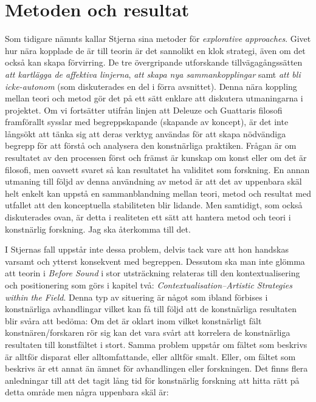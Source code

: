 \documentclass[11pt]{article}
\begin{document}
\section{Metoden och resultat}
\label{sec:orgda3e826}
Som tidigare nämnts kallar Stjerna sina metoder för \emph{explorative
approaches}. Givet hur nära kopplade de är till teorin är det sannolikt
en klok strategi, även om det också kan skapa förvirring. De tre
övergripande utforskande tillvägagångssätten \emph{att kartlägga de affektiva
linjerna}, \emph{att skapa nya sammankopplingar} samt \emph{att bli icke-autonom}
(som diskuterades en del i förra avsnittet). Denna nära koppling mellan
teori och metod gör det på ett sätt enklare att diskutera utmaningarna i
projektet. Om vi fortsätter utifrån linjen att Deleuze och Guattaris
filosofi framförallt sysslar med begreppskapande (skapande av koncept),
är det inte långsökt att tänka sig att deras verktyg användas för att
skapa nödvändiga begrepp för att förstå och analysera den konstnärliga
praktiken. Frågan är om resultatet av den processen först och främst är
kunskap om konst eller om det är filosofi, men oavsett svaret så kan
resultatet ha validitet som forskning. En annan utmaning till följd av
denna användning av metod är att det av uppenbara skäl helt enkelt kan
uppstå en sammanblandning mellan teori, metod och resultat med utfallet
att den konceptuella stabiliteten blir lidande. Men samtidigt, som också
diskuterades ovan, är detta i realiteten ett sätt att hantera metod och
teori i konstnärlig forskning. Jag ska återkomma till det.

I Stjernas fall uppstår inte dessa problem, delvis tack vare att hon
handskas varsamt och ytterst konsekvent med begreppen. Dessutom ska man
inte glömma att teorin i \emph{Before Sound} i stor utsträckning relateras
till den kontextualisering och positionering som görs i kapitel två:
\emph{Contextualisation--Artistic Strategies within the Field}. Denna typ av
situering är något som ibland förbises i konstnärliga avhandlingar
vilket kan få till följd att de konstnärliga resultaten blir svåra att
bedöma: Om det är oklart inom vilket konstnärligt fält
konstnären/forskaren rör sig kan det vara svårt att korrelera de
konstnärliga resultaten till konstfältet i stort. Samma problem uppstår
om fältet som beskrivs är alltför disparat eller alltomfattande, eller
alltför smalt. Eller, om fältet som beskrivs är ett annat än ämnet för
avhandlingen eller forskningen. Det finns flera anledningar till att det
tagit lång tid för konstnärlig forskning att hitta rätt på detta område
men några uppenbara skäl är:
\end{document}

